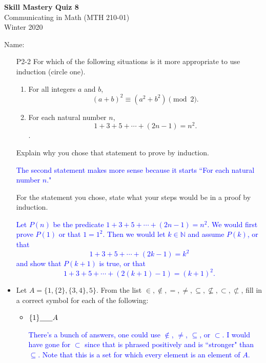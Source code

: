 \documentclass[10pt]{article}
\newcommand{\N}{\mathbb{N}}
\newcommand{\blue}{\textcolor{blue}}
\newcommand{\bs}{\begin{solution}}
\begin{document}
\vspace{-1.2in}
\begin{center} \textbf{\Large{Skill Mastery Quiz 8}} \\
Communicating in Math (MTH 210-01)\\
Winter 2020
\end{center}



\noindent Name: 




\begin{itemize}
	





\item [P2-2]  For which of the following situations is it more appropriate to use induction (circle one).
		\begin{enumerate}
		\item For all integers $a$ and $b$, 
		\[(a+b)^2 \equiv (a^2 +b^2) \pmod{2}.\]
		\item For each natural number $n$, \[1+3+5+\cdots + (2n-1) = n^2.\].
		\end{enumerate}
	Explain why you chose that statement to prove by induction.
	
	\bs \blue{The second statement makes more sense because it starts ``For each natural number $n$."}\end{solution}
	\vspace{1in}
	
	For the statement you chose, state what your steps would be in a proof by induction.
	
	\bs\blue{Let $P(n)$ be the predicate $1+3+5+\cdots + (2n-1) = n^2$. We would first prove $P(1)$ or that $1 = 1^2$. Then we would let $k\in\N$ and assume $P(k)$, or that
	\[ 1+ 3+ 5 + \cdots + (2k-1) = k^2\]
and show that $P(k+1)$ is true, or that
	\[1+3+5+\cdots+(2(k+1)-1) = (k+1)^2.\]}\end{solution}
\vfill


\newpage

\item[S1-1] Let $A = \{ 1,\{2\}, \{3,4\}, 5\}$.  From the list $\in, \notin, =,\neq,\subseteq,\not\subseteq,\subset,\not\subset$, fill in a correct symbol for each of the following:
		\begin{itemize}
		\item $\{1\} \underline{\hspace{.25in}} A$  \bs \blue{There's a bunch of answers, one could use $\notin$, $\neq$, $\subseteq$, or $\subset$. I would have gone for $\subset$ since that is phrased positively and is ``stronger" than $\subseteq$. Note that this is a set for which every element is an element of $A$. } \end{solution}
				\vspace{.5in}


\end{itemize}
\end{itemize}
\end{document}
